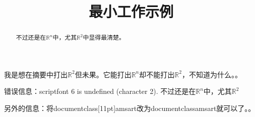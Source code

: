 \documentclass[11pt]{amsart}
\begin{document}
\title[]{\LARGE 最小工作示例}
\maketitle
\begin{abstract}
不过还是在$\mathbb{R}^n$中，尤其$\mathbb{R}^2$中显得最清楚。
\end{abstract}
我是想在摘要中打出$\mathbb{R}^2$但未果。它能打出$\mathbb{R}^n$却不能打出$\mathbb{R}^2$，不知道为什么。。

错误信息：scriptfont 6 is undefined (character 2). 不过还是在$\mathbb{R}^n$中，尤其$\mathbb{R}^2$

另外的信息：将documentclass[11pt]{amsart}改为documentclass{amsart}就可以了。。\\
\end{document}
